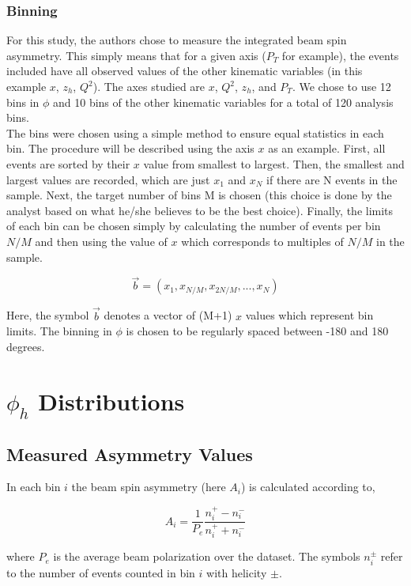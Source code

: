 \subsubsection*{Binning}
For this study, the authors chose to measure the integrated beam spin asymmetry.  This simply means that for a given axis ($P_T$ for example), the events included have all observed values of the other kinematic variables (in this example $x$, $z_h$, $Q^2$).  The axes studied are $x$, $Q^2$, $z_h$, and $P_T$.  We chose to use 12 bins in $\phi$ and 10 bins of the other kinematic variables for a total of 120 analysis bins. \\

The bins were chosen using a simple method to ensure equal statistics in each bin.  The procedure will be described using the axis $x$ as an example.  First, all events are sorted by their $x$ value from smallest to largest.  Then, the smallest and largest values are recorded, which are just $x_1$ and $x_N$ if there are N events in the sample.  Next, the target number of bins M is chosen (this choice is done by the analyst based on what he/she believes to be the best choice).  Finally, the limits of each bin can be chosen simply by calculating the number of events per bin $N/M$ and then using the value of $x$ which corresponds to multiples of $N/M$ in the sample.    

\begin{equation}
  \vec{b} = (x_1, x_{N/M}, x_{2N/M}, ..., x_N)
\end{equation}

Here, the symbol $\vec{b}$ denotes a vector of (M+1) $x$ values which represent bin limits.  The binning in $\phi$ is chosen to be regularly spaced between -180 and 180 degrees.

\section{$\phi_h$ Distributions}
\subsection*{Measured Asymmetry Values}
In each bin $i$ the beam spin asymmetry (here $A_i$) is calculated according to, 

\begin{equation}
  A_i = \frac{1}{P_e} \frac{n_i^+ - n_i^-}{n_i^+ + n_i^-}
\end{equation}

where $P_e$ is the average beam polarization over the dataset.  The symbols $n_{i}^{\pm}$ refer to the number of events counted in bin $i$ with helicity $\pm$.  

